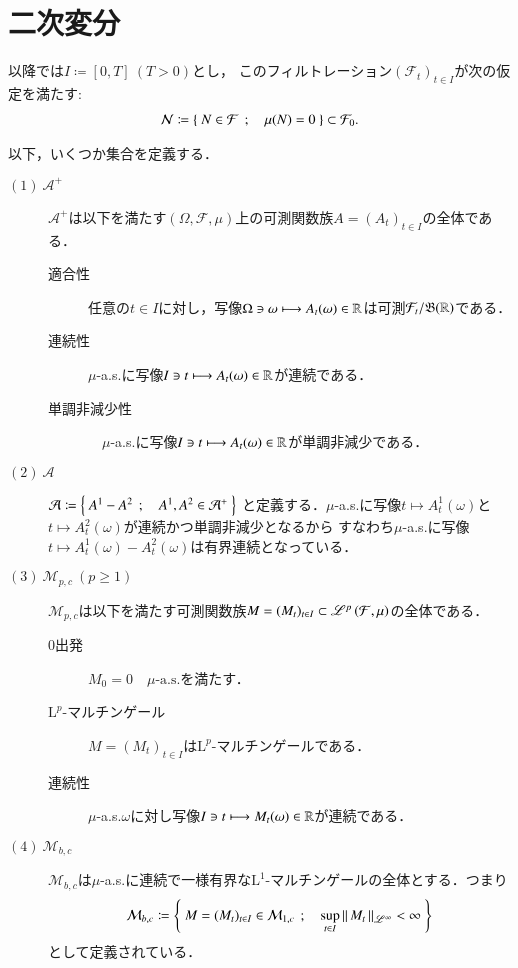 \section{二次変分}
	以降では$I \coloneqq [0,T]\ (T>0)$とし，
	このフィルトレーション$(\mathcal{F}_t)_{t \in I}$が次の仮定を満たす:
	\begin{align}
		\mathcal{N} \coloneqq \left\{\ N \in \mathcal{F}\ \, ; \quad \mu(N) = 0\ \right\}
		\subset \mathcal{F}_0.
	\end{align}
	
	以下，いくつか集合を定義する．
	\begin{description}
		\item[$\mathrm{(1)}\ \mathcal{A}^+$] 
			$\mathcal{A}^+$は以下を満たす$(\Omega,\mathcal{F},\mu)$上の可測関数族$A = (A_t)_{t \in I}$の全体である．
			\begin{description}
				\item[適合性] 任意の$t \in I$に対し，写像$\Omega \ni \omega \longmapsto A_t(\omega) \in \mathbb{R}$は可測$\mathcal{F}_t/\mathfrak{B}(\mathbb{R})$である．
				\item[連続性] $\mu$-a.s.に写像$I \ni t \longmapsto A_t(\omega) \in \mathbb{R}$が連続である．
				\item[単調非減少性]　$\mu$-a.s.に写像$I \ni t \longmapsto A_t(\omega) \in \mathbb{R}$が単調非減少である．
			\end{description}
		
		\item[$\mathrm{(2)}\ \mathcal{A}$]
			$\mathcal{A} \coloneqq \left\{\ A^1 - A^2\ \, ; \quad A^1,A^2 \in \mathcal{A}^+\ \right\}$
			と定義する．$\mu$-a.s.に写像$t \longmapsto A^1_t(\omega)$と$t \longmapsto A^2_t(\omega)$が連続かつ単調非減少となるから
			すなわち$\mu$-a.s.に写像$t \longmapsto A^1_t(\omega) - A^2_t(\omega)$は有界連続となっている．
			
		\item[$\mathrm{(3)}\ \mathcal{M}_{p,c}\ (p \geq 1)$]
			$\mathcal{M}_{p,c}$は以下を満たす可測関数族$M = (M_t)_{t \in I} \subset \mathscr{L}^{p} \left(\mathcal{F},\mu\right)$の全体である．
			\begin{description}
				\item[0出発] $M_0 = 0 \quad \mbox{$\mu$-a.s.}$を満たす．
				\item[$\mathrm{L}^p$-マルチンゲール] $M = (M_t)_{t \in I}$は$\mathrm{L}^p$-マルチンゲールである．
				\item[連続性] $\mu$-a.s.$\omega$に対し写像$I \ni t \longmapsto M_t(\omega) \in \mathbb{R}$が連続である．
			\end{description}
		
		\item[$\mathrm{(4)}\ \mathcal{M}_{b,c}$]
			$\mathcal{M}_{b,c}$は$\mu$-a.s.に連続で一様有界な$\mathrm{L}^1$-マルチンゲールの全体とする．つまり
			\begin{align}
				\mathcal{M}_{b,c} \coloneqq \left\{\ M = (M_t)_{t \in I} \in \mathcal{M}_{1,c}\ \, ; \quad \operatorname*{sup}_{t \in I} \left\|\, M_t\, \right\|_{\mathscr{L}^\infty} < \infty\ \right\}
			\end{align}
			として定義されている．
			

\end{description}
